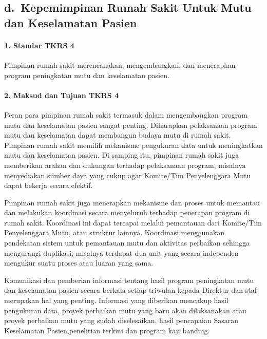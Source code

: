 \documentclass[
]{book}
\begin{document}
\hypertarget{d.-kepemimpinan-rumah-sakit-untuk-mutu-dan-keselamatan-pasien}{%
\subsection*{d.~Kepemimpinan Rumah Sakit Untuk Mutu dan Keselamatan Pasien}\label{d.-kepemimpinan-rumah-sakit-untuk-mutu-dan-keselamatan-pasien}}

\hypertarget{standar-tkrs-4}{%
\paragraph*{1. Standar TKRS 4}\label{standar-tkrs-4}}

Pimpinan rumah sakit merencanakan, mengembangkan, dan menerapkan program peningkatan mutu dan keselamatan pasien.

\hypertarget{maksud-dan-tujuan-tkrs-4}{%
\paragraph*{2. Maksud dan Tujuan TKRS 4}\label{maksud-dan-tujuan-tkrs-4}}

Peran para pimpinan rumah sakit termasuk dalam mengembangkan program mutu dan keselamatan pasien sangat penting. Diharapkan pelaksanaan program mutu dan keselamatan dapat membangun budaya mutu di rumah sakit.
Pimpinan rumah sakit memilih mekanisme pengukuran data untuk meningkatkan mutu dan keselamatan pasien. Di samping itu, pimpinan rumah sakit juga memberikan arahan dan dukungan terhadap pelaksanaan program, misalnya menyediakan sumber daya yang cukup agar Komite/Tim Penyelenggara Mutu dapat bekerja secara efektif.

Pimpinan rumah sakit juga menerapkan mekanisme dan proses untuk memantau dan melakukan koordinasi secara menyeluruh terhadap penerapan program di rumah sakit. Koordinasi ini dapat tercapai melalui pemantauan dari Komite/Tim Penyelenggara Mutu, atau struktur lainnya. Koordinasi menggunakan pendekatan sistem untuk pemantauan mutu dan aktivitas perbaikan sehingga mengurangi duplikasi; misalnya terdapat dua unit yang secara independen mengukur suatu proses atau luaran yang sama.

Komunikasi dan pemberian informasi tentang hasil program peningkatan mutu dan keselamatan pasien secara berkala setiap triwulan kepada Direktur dan staf merupakan hal yang penting. Informasi yang diberikan mencakup hasil pengukuran data, proyek perbaikan mutu yang baru akan dilaksanakan atau proyek perbaikan mutu yang sudah diselesaikan, hasil pencapaian Sasaran Keselamatan Pasien,penelitian terkini dan program kaji banding.
\end{document}
